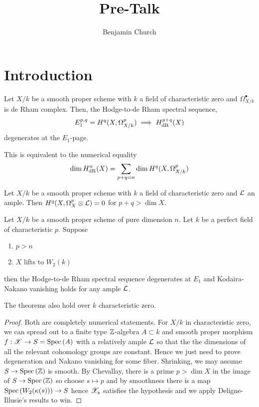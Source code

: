 \documentclass[12pt]{article}
\begin{document}
\author{Benjamin Church}
\title{\Huge Pre-Talk}

\section{Introduction}

\begin{thm}
Let $X / k$ be a smooth proper scheme with $k$ a field of characteristic zero and $\Omega^\bullet_{X/k}$ is de Rham complex. Then, the Hodge-to-de Rham spectral sequence,
\[ E_1^{p,q} = H^{q}(X, \Omega^p_{X/k}) \implies H_{\mathrm{dR}}^{p+q}(X) \]
degenerates at the $E_1$-page.
\end{thm}

\begin{rmk}
This is equivalent to the numerical equality
\[ \dim{H^n_{\mathrm{dR}}(X)} = \sum_{p + q = n} \dim{H^q(X, \Omega^p_{X/k})} \]
\end{rmk}

\begin{theorem}
Let $X / k$ be a smooth proper scheme with $k$ a field of characteristic zero and $\mathcal{L}$ an ample. Then $H^q(X, \Omega_X^p \otimes \mathcal{L}) = 0$ for $p + q > \dim{X}$. 
\end{theorem}


\begin{theorem}
Let $X / k$ be a smooth proper scheme of pure dimension $n$. Let $k$ be a perfect field of characteristic $p$. Suppose
\begin{enumerate}
\item $p > n$
\item $X$ lifts to $W_2(k)$
\end{enumerate}
then the Hodge-to-de Rham spectral sequence degenerates at $E_1$ and Kodaira-Nakano vanishing holds for any ample $\mathcal{L}$.
\end{theorem}


\begin{cor}
The theorems also hold over $k$ characteristic zero. 
\end{cor}

\begin{proof}
Both are completely numerical statements. For $X / k$ in characteristic zero, we can spread out to a finite type $\mathbb{Z}$-algebra $A \subset k$ and smooth proper morphism $f : \mathscr{X} \to S = \mathrm{Spec}\left( A \right)$ with a relatively ample $\mathcal{L}$ so that the the dimensions of all the relevant cohomology groups are constant. Hence we just need to prove degeneration and Nakano vanishing for some fiber. Shrinking, we may assume $S \to \mathrm{Spec}\left( \mathbb{Z} \right)$ is smooth. By Chevallay, there is a prime $p > \dim{X}$ in the image of $S \to \mathrm{Spec}\left( \mathbb{Z} \right)$ so choose $s \mapsto p$ and by smoothness there is a map $\mathrm{Spec}\left( W_2(\kappa(s)) \right) \to S$ hence $\mathscr{X}_s$ satisfies the hypothesis and we apply Deligne-Illusie's results to win.
\end{proof}
\end{document}
